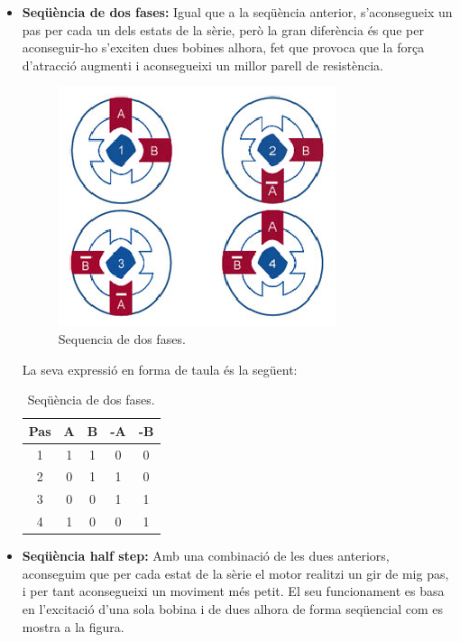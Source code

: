 \begin{itemize}
		\item \textbf{Seqüència de dos fases:} Igual que a la seqüència anterior, s'aconsegueix un pas per cada un dels estats de la sèrie, però la gran diferència és que per aconseguir-ho s'exciten dues bobines alhora, fet que provoca que la força d'atracció augmenti i aconsegueixi un millor parell de resistència. 
		\begin{figure}[H]
			\centering
			\includegraphics[scale=1.2]{Sequencia_2_fases.eps}
			\caption{Sequencia de dos fases.}
			\label{fig:Sequencia de dos fase}
		\end{figure}
		La seva expressió en forma de taula és la següent:
		\begin{table}[H]
			\begin{center}
				\begin{tabular}{|c||c|c|c|c|}
					\hline
					Pas & A & B & -A & -B \\
					\hline \hline
					1 & 1 & 1 & 0 & 0 \\ \hline
					2 & 0 & 1 & 1 & 0 \\ \hline
					3 & 0 & 0 & 1 & 1 \\ \hline
					4 & 1 & 0 & 0 & 1 \\ \hline
				\end{tabular}
				\caption{Seqüència de dos fases.}
				\label{tabla:2fase}
			\end{center}
		\end{table}
		
		\item \textbf{Seqüència half step:} Amb una combinació de les dues anteriors, aconseguim que per cada estat de la sèrie el motor realitzi un gir de mig pas, i per tant aconsegueixi un moviment més petit. El seu funcionament es basa en l'excitació d'una sola bobina i de dues alhora de forma seqüencial com es mostra  a la figura.
		

\end{itemize}
